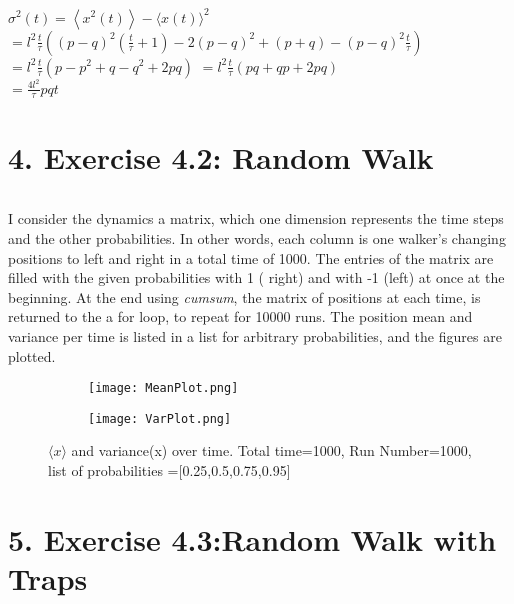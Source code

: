 \documentclass[12pt]{article}
\begin{document}
$\sigma^{2}(t)=\left\langle x^{2}(t)\right\rangle-\langle x(t)\rangle^{2}$\\
$=l^{2} \frac{t}{\tau}\left((p-q)^{2}\left(\frac{t}{\tau}+1\right)-2(p-q)^{2}+(p+q)-(p-q)^{2} \frac{t}{\tau}\right)$\\
$=l^{2} \frac{t}{\tau}\left(p-p^{2}+q-q^{2}+2 p q\right)$ $=l^{2} \frac{t}{\tau}(p q+q p+2 p q)$\\
$=\frac{4 l^{2}}{\tau} p q t$


\part*{4. Exercise 4.2: Random Walk}
\paragraph*{} I consider the dynamics a matrix, which one dimension represents the time steps and the other probabilities. In other words, each column is one walker's changing positions to left and right in a total time of 1000. The entries of the matrix are filled with the given probabilities with 1 ( right) and with -1 (left) at once at the beginning.  At the end using \textit{cumsum}, the matrix of positions at each time, is returned to the a for loop, to repeat for 10000 runs. The position mean and variance per time is listed in a list for arbitrary probabilities, and the figures are plotted. 
\begin{figure}[H]
	\centering
	\begin{subfigure}[t]{0.65\textwidth}
		\texttt{[image: MeanPlot.png]}
		\label{fig:mesh1.1}
		\caption{}
	\end{subfigure}\par\bigskip 
	\begin{subfigure}[t]{0.65\textwidth}
		\texttt{[image: VarPlot.png]}
		\label{fig:mesh1.2}
		\caption{}
	\end{subfigure}
	\label{fig:mesh1}
	\caption{$\langle x \rangle$ and variance(x) over time. Total time=1000, Run Number=1000, list of probabilities =[0.25,0.5,0.75,0.95]}
\end{figure}
\part*{5. Exercise 4.3:Random Walk with Traps}
\end{document}
